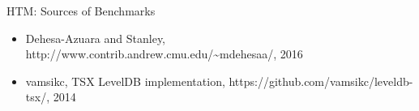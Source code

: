 \documentclass[xcolor=dvipsnames]{beamer}
\newcommand\hilight[2]{\color{#1}#2\color{black}}
\begin{document}


\begin{frame}{HTM: Sources of Benchmarks}
	\begin{itemize}
		\item Dehesa-Azuara and Stanley, http://www.contrib.andrew.cmu.edu/\textasciitilde{}mdehesaa/, 2016
		\item vamsikc, TSX LevelDB implementation, https://github.com/vamsikc/leveldb-tsx/, 2014
	\end{itemize}
\end{frame}

\newcommand\tii{\ensuremath{\hilight{lavender}{\mathbf{Ti}}}\xspace}
\newcommand\tjj{\ensuremath{\hilight{seafoam}{\mathbf{Tj}}}\xspace}
\newcommand\tkk{\ensuremath{\hilight{salmon}{\mathbf{Tk}}}\xspace}

\newcommand\tiiat[1]{\ensuremath{\hilight{lavender}{\mathbf{Ti}@#1}}\xspace}
\newcommand\tjjat[1]{\ensuremath{\hilight{seafoam} {\mathbf{Tj}@#1}}\xspace}
\newcommand\tkkat[1]{\ensuremath{\hilight{salmon}  {\mathbf{Tk}@#1}}\xspace}
\end{document}
